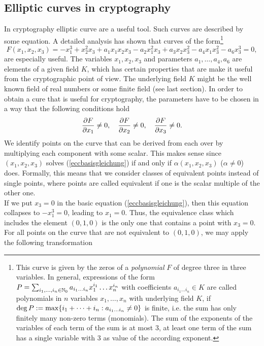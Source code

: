 \subsection{Elliptic curves in cryptography}\label{ECC-Crypto}

In cryptography elliptic curve are a useful tool. Such curves are described by some equation. A detailed analysis has shown that curves of the form\footnote{This curve is given by the zeros of a {\it polynomial} $F$ of degree three in three variables. In general, expressions of the form
$P=\sum_{i_1,\dots,i_n\in\mathbb{N}_0} a_{i_1\dots i_n} x_1^{i_1}\dots x_n^{i_n}$ with coefficients $a_{i_1\dots i_n}\in K$ are called polynomials in $n$ variables $x_1,\dots,x_n$ with underlying field $K$, if ${\rm deg\,} P:=\max\{i_1+\dots +i_n: a_{i_1\dots i_n}\ne 0\}$ is finite, i.e. the sum has only finitely many non-zero terms (monomials). The sum of the exponents of the variables of each term of the sum is at most $3$, at least one term of the sum has a single variable with $3$ as value of the according exponent.}
\begin{equation}
 F(x_1,x_2,x_3)=-x_1^3+x_2^2x_3+a_1x_1x_2x_3-a_2x_1^2x_3+a_3x_2x_3^2-a_4x_1x_3^2-a_6x_3^3=0,
\label{eccbasisgleichung}
\end{equation}
are especially useful. The variables $x_1,x_2,x_3$ and parameters $a_1,\dots,a_4,a_6$ are elements of a given field $K$, which has certain properties that are make it useful from the cryptographic point of view. The underlying field $K$ might be the well known field of real numbers or some finite field (see last section).
In order to obtain a cure that is useful for cryptography, the parameters have to be chosen in a way that the following conditions hold
$$ {\partial F\over\partial x_1}\ne 0, \quad {\partial F\over\partial x_2}\ne 0, \quad
{\partial F\over\partial x_3}\ne 0 .
$$
We identify points on the curve that can be derived from each over by multiplying each component with some scalar. This makes sense since $(x_1,x_2,x_3)$ solves (\ref{eccbasisgleichung}) if and only if $\alpha (x_1,x_2,x_3)$ ($\alpha\ne 0$) does. Formally, this means that we consider classes of equivalent points instead of single points, where points are called equivalent if one is the scalar multiple of the other one.
\\ If we put $x_3=0$ in the basic equation (\ref{eccbasisgleichung}), then this equation collapses to $-x_1^3=0$, leading to $x_1=0$. Thus, the equivalence class which includes the element $(0,1,0)$ is the only one that contains a point with $x_3=0$. For all points on the curve that are not equivalent to $(0,1,0)$, we may apply the following transformation
